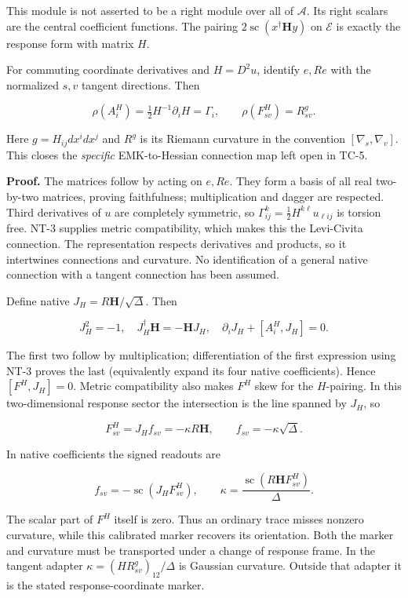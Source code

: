 \documentclass[
  11pt,
]{article}
\begin{document}
This module is not asserted to be a right module over all of
\(\mathcal A\). Its right scalars are the central coefficient functions.
The pairing \(2\operatorname{sc}(x^\dagger\mathbf Hy)\) on
\(\mathcal E\) is exactly the response form with matrix \(H\).

For commuting coordinate derivatives and \(H=D^2u\), identify \(e,Re\)
with the normalized \(s,v\) tangent directions. Then

\[
\rho(A_i^H)=\tfrac12H^{-1}\partial_iH=\Gamma_i,
\qquad \boxed{\rho(F^H_{sv})=R^g_{sv}}.
\]

Here \(g=H_{ij}dx^idx^j\) and \(R^g\) is its Riemann curvature in the
convention \([\nabla_s,\nabla_v]\). This closes the \emph{specific}
EMK-to-Hessian connection map left open in TC-5.

\textbf{Proof.} The matrices follow by acting on \(e,Re\). They form a
basis of all real two-by-two matrices, proving faithfulness;
multiplication and dagger are respected. Third derivatives of \(u\) are
completely symmetric, so \(\Gamma^k_{ij}=\frac12H^{k\ell}u_{\ell ij}\)
is torsion free. NT-3 supplies metric compatibility, which makes this
the Levi-Civita connection. The representation respects derivatives and
products, so it intertwines connections and curvature. No identification
of a general native connection with a tangent connection has been
assumed.

Define native \(J_H=R\mathbf H/\sqrt\Delta\). Then

\[
J_H^2=-1,\quad J_H^\dagger\mathbf H=-\mathbf HJ_H,\quad
\partial_iJ_H+[A_i^H,J_H]=0.
\]

The first two follow by multiplication; differentiation of the first
expression using NT-3 proves the last (equivalently expand its four
native coefficients). Hence \([F^H,J_H]=0\). Metric compatibility also
makes \(F^H\) skew for the \(H\)-pairing. In this two-dimensional
response sector the intersection is the line spanned by \(J_H\), so

\[
F^H_{sv}=J_H f_{sv}=-\kappa R\mathbf H,\qquad
f_{sv}=-\kappa\sqrt\Delta.
\]

In native coefficients the signed readouts are

\[
\boxed{f_{sv}=-\operatorname{sc}(J_HF^H_{sv}),\qquad
\kappa=\frac{\operatorname{sc}(R\mathbf HF^H_{sv})}{\Delta}.}
\]

The scalar part of \(F^H\) itself is zero. Thus an ordinary trace misses
nonzero curvature, while this calibrated marker recovers its
orientation. Both the marker and curvature must be transported under a
change of response frame. In the tangent adapter
\(\kappa=(HR^g_{sv})_{12}/\Delta\) is Gaussian curvature. Outside that
adapter it is the stated response-coordinate marker.
\end{document}
